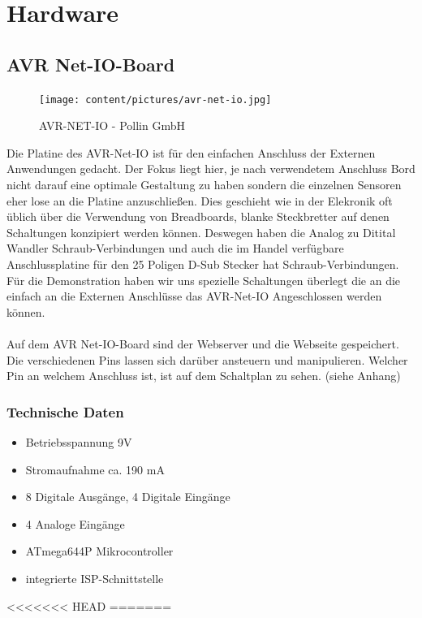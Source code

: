 \chapter{Hardware}
\section{AVR Net-IO-Board}
\begin{figure}[h]
\centering
\texttt{[image: content/pictures/avr-net-io.jpg]}
\caption{AVR-NET-IO - Pollin GmbH}
\label{fig:B3}
\end{figure}
Die Platine des AVR-Net-IO ist für den einfachen Anschluss der Externen
Anwendungen gedacht. Der Fokus liegt hier, je nach verwendetem Anschluss Bord
nicht darauf eine optimale Gestaltung zu haben sondern die einzelnen Sensoren
eher lose an die Platine anzuschließen. Dies geschieht wie in der Elekronik oft
üblich über die Verwendung von Breadboards, blanke Steckbretter auf
denen Schaltungen konzipiert werden können. Deswegen haben die Analog zu Ditital
Wandler Schraub-Verbindungen und auch die im Handel verfügbare Anschlussplatine
für den 25 Poligen D-Sub Stecker hat Schraub-Verbindungen. Für die Demonstration
haben wir uns spezielle Schaltungen überlegt die an die einfach an die Externen
Anschlüsse das AVR-Net-IO Angeschlossen werden können. \\
\\
Auf dem AVR Net-IO-Board sind der Webserver und die Webseite gespeichert. Die verschiedenen Pins lassen sich darüber 
ansteuern und manipulieren. Welcher Pin an welchem Anschluss ist, ist auf dem Schaltplan zu sehen. (siehe Anhang)

\subsection{Technische Daten}
\begin{itemize}
  \item Betriebsspannung 9V 
  \item Stromaufnahme ca. 190 mA
  \item 8 Digitale Ausgänge, 4 Digitale Eingänge
  \item 4 Analoge Eingänge
  \item ATmega644P Mikrocontroller
  \item integrierte ISP-Schnittstelle
\end{itemize}
<<<<<<< HEAD
\newpage
=======



